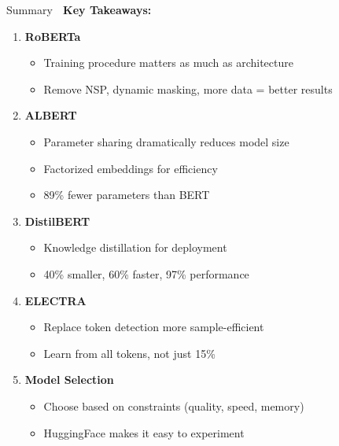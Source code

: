 \documentclass[aspectratio=169]{beamer}
\begin{document}
\begin{frame}[shrink=10]{Summary 🎯}
\textbf{Key Takeaways:}

\vspace{1em}

\begin{enumerate}\setlength{\itemsep}{0pt}
    \item \textbf{RoBERTa}
    \begin{itemize}\setlength{\itemsep}{0pt}
        \item Training procedure matters as much as architecture
        \item Remove NSP, dynamic masking, more data = better results
    \end{itemize}

    \item \textbf{ALBERT}
    \begin{itemize}\setlength{\itemsep}{0pt}
        \item Parameter sharing dramatically reduces model size
        \item Factorized embeddings for efficiency
        \item 89\% fewer parameters than BERT
    \end{itemize}

    \item \textbf{DistilBERT}
    \begin{itemize}\setlength{\itemsep}{0pt}
        \item Knowledge distillation for deployment
        \item 40\% smaller, 60\% faster, 97\% performance
    \end{itemize}

    \item \textbf{ELECTRA}
    \begin{itemize}\setlength{\itemsep}{0pt}
        \item Replace token detection more sample-efficient
        \item Learn from all tokens, not just 15\%
    \end{itemize}

    \item \textbf{Model Selection}
    \begin{itemize}\setlength{\itemsep}{0pt}
        \item Choose based on constraints (quality, speed, memory)
        \item HuggingFace makes it easy to experiment
    \end{itemize}
\end{enumerate}
\end{frame}
\end{document}
